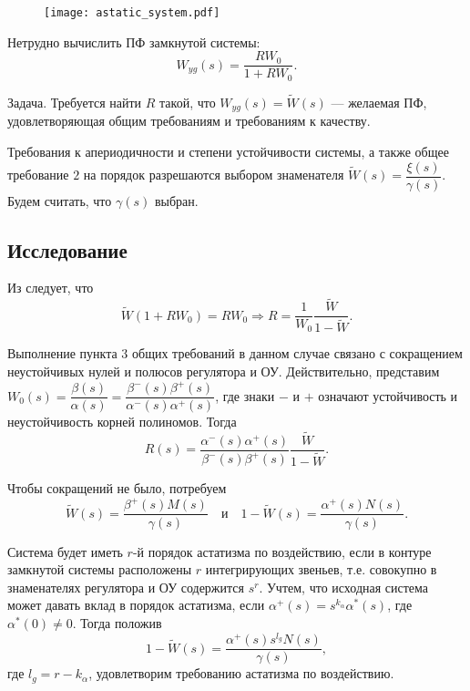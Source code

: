 \documentclass[../../TAU.tex]{subfiles}
\begin{document}
    \begin{figure}[h]
        \centering
        \texttt{[image: astatic\_system.pdf]}
    \end{figure}

    Нетрудно вычислить ПФ замкнутой системы:
    \begin{equation}\label{WYG}
        W_{yg}(s) = \frac{RW_0}{1+RW_0}.
    \end{equation}

    Задача. Требуется найти $R$ такой, что $W_{yg}(s) = \tilde W (s)$ --- желаемая ПФ, удовлетворяющая общим требованиям и требованиям к качеству.

    Требования к апериодичности и степени устойчивости системы, а также общее требование $2$ на порядок разрешаются выбором знаменателя $\tilde W(s) = \dfrac{\xi(s)}{\gamma(s)}$. Будем считать, что $\gamma(s)$ выбран.

\subsection{Исследование}

    Из  следует, что
    $$
        \tilde W(1+RW_0) = RW_0 \Longrightarrow R = \frac{1}{W_0}\frac{\tilde W}{1-\tilde W}.
    $$

    Выполнение пункта 3 общих требований в данном случае связано с сокращением неустойчивых нулей и полюсов регулятора и ОУ. Действительно, представим $W_0(s) = \dfrac{\beta(s)}{\alpha(s)} = \dfrac{\beta^-(s)\beta^+(s)}{\alpha^-(s)\alpha^+(s)}$, где знаки $-$ и $+$ означают устойчивость и неустойчивость корней полиномов. Тогда
    $$
        R(s) = \frac{\alpha^-(s)\alpha^+(s)}{\beta^-(s)\beta^+(s)}\frac{\tilde W}{1-\tilde W}.
    $$

    Чтобы сокращений не было, потребуем
    $$
        \tilde W(s) = \frac{\beta^+(s)M(s)}{\gamma(s)}\quad \text{и}\quad 1-\tilde W(s) = \frac{\alpha^+(s)N(s)}{\gamma(s)}.
    $$

    Система будет иметь $r$-й порядок астатизма по воздействию, если в контуре замкнутой системы расположены $r$ интегрирующих звеньев, т.е. совокупно в знаменателях регулятора и ОУ содержится $s^r$. Учтем, что исходная система может давать вклад в порядок астатизма, если  ${\alpha^+(s) = s^{k_\alpha} \alpha^*(s)}$, где $\alpha^*(0)\neq0$. Тогда положив
    \begin{equation}\label{EQ1}
        1-\tilde W(s) = \frac{\alpha^+(s)s^{l_g}N(s)}{\gamma(s)},
    \end{equation}
    где $l_g = r-k_\alpha$, удовлетворим требованию астатизма по воздействию.
\end{document}

